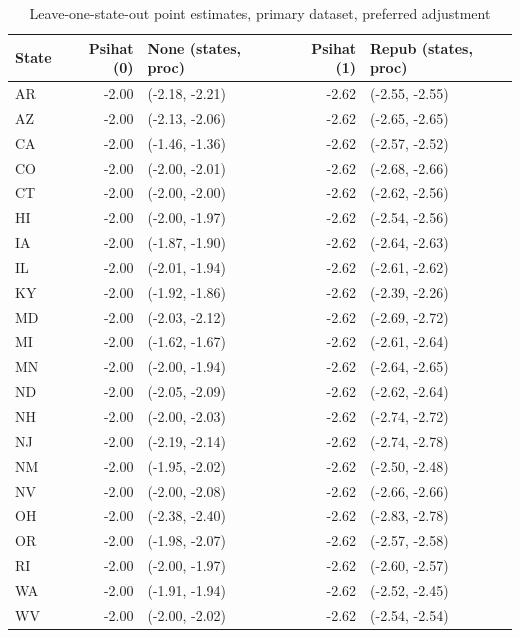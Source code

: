 \documentclass[12pt]{article}
\begin{document}
\begin{table}[ht]
\centering
\begin{tabular}{lrlrl}
  \toprule
State & Psihat (0) & None (states, proc) & Psihat (1) & Repub (states, proc) \\ 
  \midrule
AR & -2.00 & (-2.18, -2.21) & -2.62 & (-2.55, -2.55) \\ 
  AZ & -2.00 & (-2.13, -2.06) & -2.62 & (-2.65, -2.65) \\ 
  CA & -2.00 & (-1.46, -1.36) & -2.62 & (-2.57, -2.52) \\ 
  CO & -2.00 & (-2.00, -2.01) & -2.62 & (-2.68, -2.66) \\ 
  CT & -2.00 & (-2.00, -2.00) & -2.62 & (-2.62, -2.56) \\ 
  HI & -2.00 & (-2.00, -1.97) & -2.62 & (-2.54, -2.56) \\ 
  IA & -2.00 & (-1.87, -1.90) & -2.62 & (-2.64, -2.63) \\ 
  IL & -2.00 & (-2.01, -1.94) & -2.62 & (-2.61, -2.62) \\ 
  KY & -2.00 & (-1.92, -1.86) & -2.62 & (-2.39, -2.26) \\ 
  MD & -2.00 & (-2.03, -2.12) & -2.62 & (-2.69, -2.72) \\ 
  MI & -2.00 & (-1.62, -1.67) & -2.62 & (-2.61, -2.64) \\ 
  MN & -2.00 & (-2.00, -1.94) & -2.62 & (-2.64, -2.65) \\ 
  ND & -2.00 & (-2.05, -2.09) & -2.62 & (-2.62, -2.64) \\ 
  NH & -2.00 & (-2.00, -2.03) & -2.62 & (-2.74, -2.72) \\ 
  NJ & -2.00 & (-2.19, -2.14) & -2.62 & (-2.74, -2.78) \\ 
  NM & -2.00 & (-1.95, -2.02) & -2.62 & (-2.50, -2.48) \\ 
  NV & -2.00 & (-2.00, -2.08) & -2.62 & (-2.66, -2.66) \\ 
  OH & -2.00 & (-2.38, -2.40) & -2.62 & (-2.83, -2.78) \\ 
  OR & -2.00 & (-1.98, -2.07) & -2.62 & (-2.57, -2.58) \\ 
  RI & -2.00 & (-2.00, -1.97) & -2.62 & (-2.60, -2.57) \\ 
  WA & -2.00 & (-1.91, -1.94) & -2.62 & (-2.52, -2.45) \\ 
  WV & -2.00 & (-2.00, -2.02) & -2.62 & (-2.54, -2.54) \\ 
   \bottomrule
\end{tabular}
   \caption{Leave-one-state-out point estimates, primary dataset, preferred adjustment}
    \label{tab:loostatec1}
\end{table}
\end{document}
